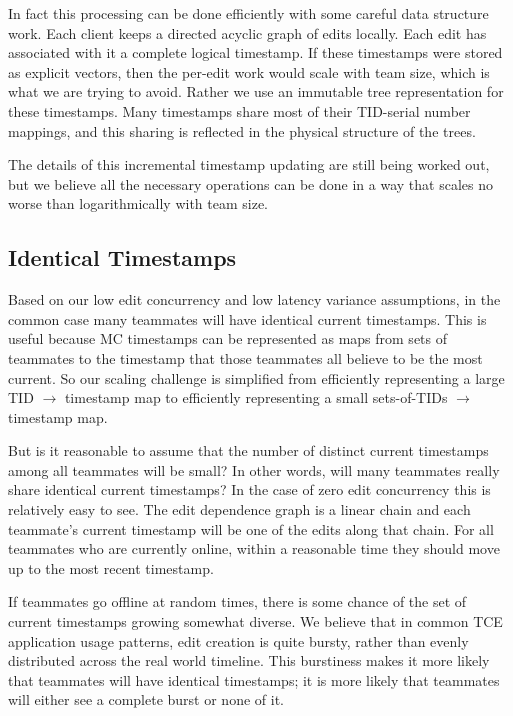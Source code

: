 \documentclass[runningheads]{llncs}
\begin{document}
In fact this processing can be done efficiently with some careful data structure work.
Each client keeps a directed acyclic graph of edits locally\footnotemark{}.
Each edit has associated with it a complete logical timestamp.
If these timestamps were stored as explicit vectors, then the per-edit work would scale with team size, which is what we are trying to avoid.
Rather we use an immutable tree representation for these timestamps.
Many timestamps share most of their TID-serial number mappings, and this sharing is reflected in the physical structure of the trees.

The details of this incremental timestamp updating are still being worked out, but we believe all the necessary operations can be done in a way that scales no worse than logarithmically with team size.

\subsection{Identical Timestamps}

Based on our low edit concurrency and low latency variance assumptions, in the common case many teammates will have identical current timestamps.
This is useful because MC timestamps can be represented as maps from sets of teammates to the timestamp that those teammates all believe to be the most current.
So our scaling challenge is simplified from efficiently representing a large TID $\rightarrow$ timestamp map to efficiently representing a small sets-of-TIDs $\rightarrow$ timestamp map.

But is it reasonable to assume that the number of distinct current timestamps among all teammates will be small?
In other words, will many teammates really share identical current timestamps?
In the case of zero edit concurrency this is relatively easy to see.
The edit dependence graph is a linear chain and each teammate's current timestamp will be one of the edits along that chain.
For all teammates who are currently online, within a reasonable time they should move up to the most recent timestamp.

If teammates go offline at random times, there is some chance of the set of current timestamps growing somewhat diverse.
We believe that in common TCE application usage patterns, edit creation is quite bursty, rather than evenly distributed across the real world timeline.
This burstiness makes it more likely that teammates will have identical timestamps; it is more likely that teammates will either see a complete burst or none of it.
\end{document}
